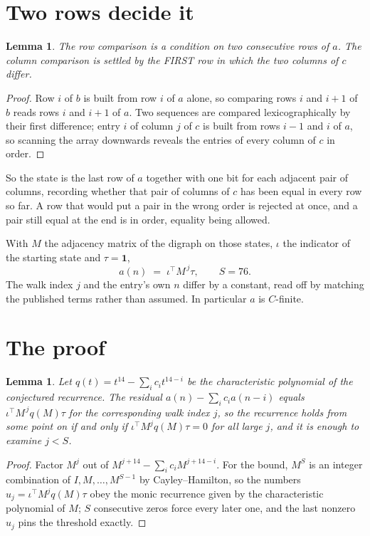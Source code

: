 \documentclass[11pt,a4paper]{article}
\theoremstyle{plain}
\newtheorem{lemma}[theorem]{Lemma}
\theoremstyle{definition}
\begin{document}
\section{Two rows decide it}

\begin{lemma}\label{lem:win}
The row comparison is a condition on two consecutive rows of $a$. The column comparison is
settled by the FIRST row in which the two columns of $c$ differ.
\end{lemma}

\begin{proof}
Row $i$ of $b$ is built from row $i$ of $a$ alone, so comparing rows $i$ and $i+1$ of $b$ reads
rows $i$ and $i+1$ of $a$. Two sequences are compared lexicographically by their first
difference; entry $i$ of column $j$ of $c$ is built from rows $i-1$ and $i$ of $a$, so scanning
the array downwards reveals the entries of every column of $c$ in order.
\end{proof}

So the state is the last row of $a$ together with one bit for each adjacent pair of columns,
recording whether that pair of columns of $c$ has been equal in every row so far. A row that
would put a pair in the wrong order is rejected at once, and a pair still equal at the end is
in order, equality being allowed.

With $M$ the adjacency matrix of the digraph on those states, $\iota$ the indicator of the
starting state and $\tau=\mathbf{1}$,
\[
a(n)\;=\;\iota^{\!\top}M^{\,j}\tau ,\qquad S=76.
\]
The walk index $j$ and the entry's own $n$ differ by a constant, read off by matching the
published terms rather than assumed. In particular $a$ is $C$-finite.

\section{The proof}

\begin{lemma}\label{lem:crit}
Let $q(t)=t^{14}-\sum_i c_it^{14-i}$ be the characteristic polynomial of the
conjectured recurrence. The residual $a(n)-\sum_ic_ia(n-i)$ equals
$\iota^{\!\top}M^{\,j}q(M)\tau$ for the corresponding walk index $j$, so the recurrence
holds from some point on if and only if $\iota^{\!\top}M^{j}q(M)\tau=0$ for all large $j$,
and it is enough to examine $j<S$.
\end{lemma}

\begin{proof}
Factor $M^{j}$ out of $M^{j+14}-\sum_ic_iM^{j+14-i}$. For the bound, $M^{S}$
is an integer combination of $I,M,\dots,M^{S-1}$ by Cayley--Hamilton, so the numbers
$u_j=\iota^{\!\top}M^{j}q(M)\tau$ obey the monic recurrence given by the characteristic
polynomial of $M$; $S$ consecutive zeros force every later one, and the last nonzero $u_j$
pins the threshold exactly.
\end{proof}
\end{document}
